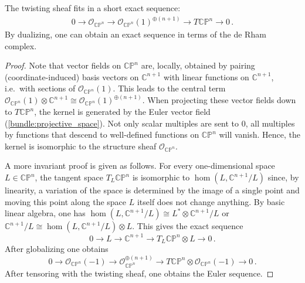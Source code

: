     \begin{property}
        The twisting sheaf fits in a short exact sequence:
        \begin{gather}
            0\longrightarrow\mathcal{O}_{\mathbb{CP}^n}\longrightarrow\mathcal{O}_{\mathbb{CP}^n}(1)^{\oplus(n+1)}\longrightarrow T\mathbb{CP}^n\longrightarrow0\,.
        \end{gather}
        By dualizing, one can obtain an exact sequence in terms of the de Rham complex.
        \begin{mdframed}[roundcorner=10pt, linecolor=blue, linewidth=1pt]
            \begin{proof}
                Note that vector fields on $\mathbb{CP}^n$ are, locally, obtained by pairing (coordinate-induced) basis vectors on $\mathbb{C}^{n+1}$ with linear functions on $\mathbb{C}^{n+1}$, i.e.~with sections of $\mathcal{O}_{\mathbb{CP}^n}(1)$. This leads to the central term $\mathcal{O}_{\mathbb{CP}^n}(1)\otimes\mathbb{C}^{n+1}\cong\mathcal{O}_{\mathbb{CP}^n}(1)^{\oplus(n+1)}$. When projecting these vector fields down to $T\mathbb{CP}^n$, the kernel is generated by the Euler vector field (\cref{bundle:projective_space}). Not only scalar multiples are sent to 0, all multiples by functions that descend to well-defined functions on $\mathbb{CP}^n$ will vanish. Hence, the kernel is isomorphic to the structure sheaf $\mathcal{O}_{\mathbb{CP}^n}$.

                A more invariant proof is given as follows. For every one-dimensional space $L\in\mathbb{CP}^n$, the tangent space $T_L\mathbb{CP}^n$ is isomorphic to $\hom(L,\mathbb{C}^{n+1}/L)$ since, by linearity, a variation of the space is determined by the image of a single point and moving this point along the space $L$ itself does not change anything. By basic linear algebra, one has $\hom(L,\mathbb{C}^{n+1}/L)\cong L^*\otimes\mathbb{C}^{n+1}/L$ or $\mathbb{C}^{n+1}/L\cong\hom(L,\mathbb{C}^{n+1}/L)\otimes L$. This gives the exact sequence \[0\longrightarrow L\longrightarrow\mathbb{C}^{n+1}\longrightarrow T_L\mathbb{CP}^n\otimes L\longrightarrow0\,.\] After globalizing one obtains \[0\longrightarrow\mathcal{O}_{\mathbb{CP}^n}(-1)\longrightarrow\mathcal{O}_{\mathbb{CP}^n}^{\oplus(n+1)}\longrightarrow T\mathbb{CP}^n\otimes\mathcal{O}_{\mathbb{CP}^n}(-1)\longrightarrow0\,.\] After tensoring with the twisting sheaf, one obtains the Euler sequence.
            \end{proof}
        \end{mdframed}
    \end{property}

